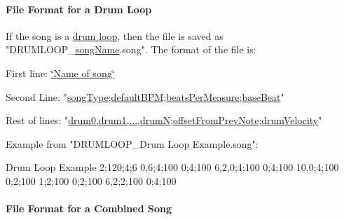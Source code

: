 \hypertarget{group___song_management_DocSongFileFormatDrumLoop}{}\paragraph{File Format for a Drum Loop}\label{group___song_management_DocSongFileFormatDrumLoop}
If the song is a \hyperlink{group___song_management_DocSongDrumLoop}{drum loop}, then the file is saved as "D\+R\+U\+M\+L\+O\+O\+P\+\_\+\hyperlink{group___song_priv_var_ga6a5e6c1e4aa92939e2b5c1e3d9908df8}{song\+Name}.song". The format of the file is\+: \begin{DoxyItemize}
\item First line\+: \hyperlink{group___song_priv_var_ga6a5e6c1e4aa92939e2b5c1e3d9908df8}{\char`\"{}\+Name of song\char`\"{}} \item Second Line\+: "\hyperlink{group___song_enums_gae681a1f001333e39fc1cb4fea97bfe1b}{song\+Type};\hyperlink{group___audio_DefBPM}{default\+B\+PM};\hyperlink{group___music_structs_acda79d249e7a1974a152832a881e9f0b}{beats\+Per\+Measure};\hyperlink{group___music_structs_aaf5b010a2541959c26f96630db042ee8}{base\+Beat}" \item Rest of lines\+: "\hyperlink{group___music_structs_a11ba5b49d8ee25941337573029660f25}{drum0,drum1,...,drumN};\hyperlink{group___music_structs_ae281187907aed4c728c7981300dbebaf}{offset\+From\+Prev\+Note};\hyperlink{group___music_structs_a98181a53f924736c2df08f886cffed7d}{drum\+Velocity}" \item Example from "D\+R\+U\+M\+L\+O\+O\+P\+\_\+\+Drum Loop Example.\+song"\+: \begin{DoxyVerb}Drum Loop Example
2;120;4;6
0,6;4;100
0;4;100
6,2,0;4;100
0;4;100
10,0;4;100
0;2;100
1;2;100
0;2;100
6,2;2;100
0;4;100
\end{DoxyVerb}
\end{DoxyItemize}
\hypertarget{group___song_management_DocSongFileFormatCombined}{}\paragraph{File Format for a Combined Song}\label{group___song_management_DocSongFileFormatCombined}
